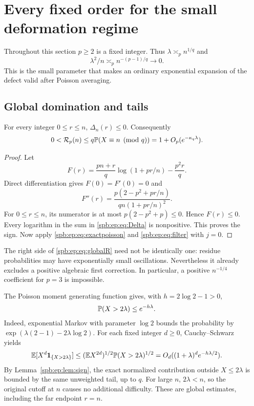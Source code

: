 \section{Every fixed order for the small deformation regime}
\label{spb:ep:sec:subcritical}
Throughout this section $p\ge2$ is a fixed integer. Thus
$\lambda\asymp_p n^{1/q}$ and
\begin{equation}\label{spb:ep:eq:small}
 \lambda^2/n\asymp_p n^{-(p-1)/q}\longrightarrow0.
\end{equation}
This is the small parameter that makes an ordinary exponential expansion
of the defect valid after Poisson averaging.

\subsection{Global domination and tails}
\begin{lemma}\label{spb:ep:lem:sign}
For every integer $0\le r\le n$, $\Delta_n(r)\le0$.
Consequently
\begin{equation}\label{spb:ep:eq:globalR}
 0<\mathcal R_p(n)\le q\mathbb P(X\equiv n\pmod q)
             =1+O_p(e^{-\kappa_q\lambda}).
\end{equation}
\end{lemma}
\begin{proof}
Let
\[
 F(r)=\frac{pn+r}{q}\log(1+pr/n)-\frac{p^2r}{q}.
\]
Direct differentiation gives $F(0)=F'(0)=0$ and
\begin{equation}\label{spb:ep:eq:Fsecond}
 F''(r)=\frac{p(2-p^2+pr/n)}{qn(1+pr/n)^2}.
\end{equation}
For $0\le r\le n$, its numerator is at most
$p(2-p^2+p)\le0$. Hence $F(r)\le0$.
Every logarithm in the sum in \eqref{spb:ep:eq:Delta} is nonpositive.
This proves the sign. Now apply \eqref{spb:ep:eq:exactpoisson} and
\eqref{spb:ep:eq:filter} with $j=0$.
\end{proof}

The right side of \eqref{spb:ep:eq:globalR} need not be identically one:
residue probabilities may have exponentially small oscillations.
Nevertheless it already excludes a positive algebraic first correction.
In particular, a positive $n^{-1/4}$ coefficient for $p=3$ is impossible.

The Poisson moment generating function gives, with
$h=2\log2-1>0$,
\begin{equation}\label{spb:ep:eq:tail}
 \mathbb P(X>2\lambda)\le e^{-h\lambda}.
\end{equation}
Indeed, exponential Markov with parameter $\log2$ bounds the probability
by $\exp(\lambda(2-1)-2\lambda\log2)$.
For each fixed integer $d\ge0$, Cauchy--Schwarz yields
\begin{equation}\label{spb:ep:eq:weightedtail}
 \mathbb E[X^d\mathbf 1_{\{X>2\lambda\}}]
   \le (\mathbb E X^{2d})^{1/2}\mathbb P(X>2\lambda)^{1/2}
   =O_d((1+\lambda)^d e^{-h\lambda/2}).
\end{equation}
By Lemma~\ref{spb:ep:lem:sign}, the exact normalized contribution outside
$X\le2\lambda$ is bounded by the same unweighted tail, up to $q$.
For large $n$, $2\lambda<n$, so the original cutoff at $n$ causes no
additional difficulty. These are global estimates, including the far
endpoint $r=n$.


